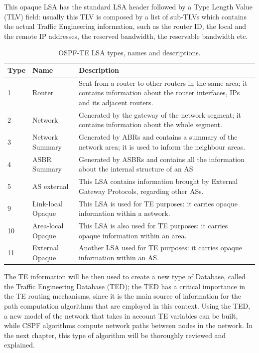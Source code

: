 \documentclass[10pt,a4paper]{report}
\begin{document}
\newpage

This opaque LSA has the standard LSA header followed by a Type Length
Value (TLV) field: usually this TLV is composed by a list of sub-TLVs
which contains the actual Traffic Engineering information, such as the
router ID, the local and the remote IP addresses, the reserved
bandwidth, the reservable bandwidth etc.

\begin{table}[!tbp]
  \begin{center}
    \begin{tabular}{|l|l|p{}|}
      \hline
      Type& Name & Description \\ \hline
      1 &  Router & Sent from a router to other routers in the same
      area; it contains information about the router interfaces, IPs
      and its adjacent routers. \\
      2 & Network & Generated by the gateway of the network segment;
      it contains information about the whole segment. \\
      3 & Network Summary & Generated by ABRs and contains a summary
      of the network area; it is used to inform the neighbour areas. \\
      4 & ASBR Summary &  Generated by ASBRs and contains all the
      information about the internal structure of an AS \\
      5 & AS external &  This LSA contains information brought by
      External Gateway Protocols, regarding other ASs. \\
      9 & Link-local Opaque & This LSA is used for TE purposes: it
      carries opaque information within a network. \\
      10 & Area-local Opaque & This LSA is also used for TE purposes:
      it carries opaque information within an area. \\
      11 & External Opaque & Another LSA used for TE purposes: it
      carries opaque information within an AS. \\
      \hline
    \end{tabular}
    \caption[OSPF-TE LSA types]{OSPF-TE LSA types, names and
      descriptions.}
    \label{tab:ospf_lsa}
  \end{center}
\end{table}

The TE information will be then used to create a new type of Database,
called the Traffic Engineering Database (TED); the TED has a critical
importance in the TE routing mechanisms, since it is the main source
of information for the path computation algorithms that are employed
in this context. Using the TED, a new model of the network that takes
in account TE variables can be built, while CSPF algorithms compute
network paths between nodes in the network. In the next chapter, this
type of algorithm will be thoroughly reviewed and explained.
\end{document}
